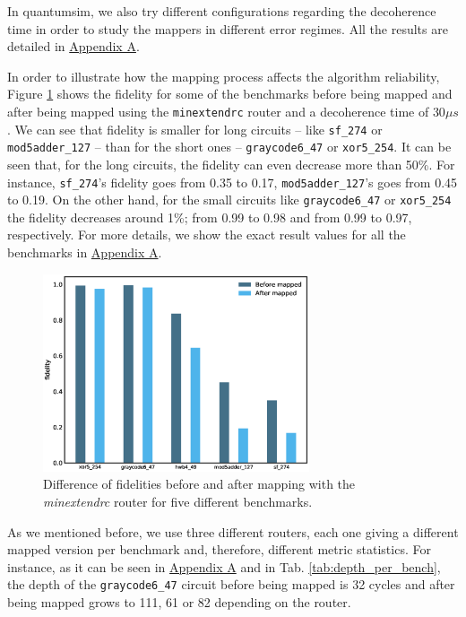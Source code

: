 In quantumsim, we also try different configurations regarding the decoherence time in order to study the mappers in different error regimes. 
All the results are detailed in \href{appendix-1.org}{Appendix A}.


In order to illustrate how the mapping process affects the algorithm reliability, Figure \ref{fig:f_diff_bar_plot} shows the fidelity for some of the benchmarks before being mapped and after being mapped using the \texttt{minextendrc} router and a decoherence time of $30 \mu s$.
We can see that fidelity is smaller for long circuits -- like \texttt{sf\_274} or \texttt{mod5adder\_127} -- than for the short ones -- \texttt{graycode6\_47} or \texttt{xor5\_254}.
It can be seen that, for the long circuits, the fidelity can even decrease more than 50\%.
For instance, \texttt{sf\_274}'s fidelity goes from 0.35 to 0.17, \texttt{mod5adder\_127}'s goes from 0.45 to 0.19.
On the other hand, for the small circuits like \texttt{graycode6\_47} or \texttt{xor5\_254} the fidelity decreases around 1\%; from 0.99 to 0.98 and from 0.99 to 0.97, respectively.
For more details, we show the exact result values for all the benchmarks in \href{appendix-1.org}{Appendix A}.

\begin{figure}[htbp]
\centering
\includegraphics[width=0.7\textwidth]{figures/f_diff_bar_plot.eps}
\caption{\label{fig:f_diff_bar_plot}
Difference of fidelities before and after mapping with the \emph{minextendrc} router for five different benchmarks.}
\end{figure}
As we mentioned before, we use three different routers, each one giving a different mapped version per benchmark and, therefore, different metric statistics.
For instance, as it can be seen in \href{appendix-1.org}{Appendix A} and in Tab. \ref{tab:depth_per_bench}, the depth of the \texttt{graycode6\_47} circuit before being mapped is 32 cycles and after being mapped grows to 111, 61 or 82 depending on the router.

